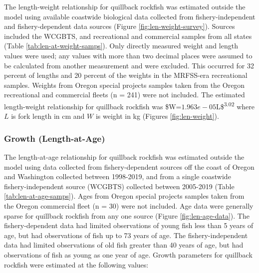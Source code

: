 \documentclass[11pt,
  english,
  letterpaper,
]{article}
\begin{document}
The length-weight relationship for quillback rockfish was estimated outside the model using available coastwide biological data collected from fishery-independent and fishery-dependent data sources (Figure \ref{fig:len-weight-survey}). Sources included the WCGBTS, and recreational and commercial samples from all states (Table \ref{tab:len-at-weight-samps}). Only directly measured weight and length values were used; any values with more than two decimal places were assumed to be calculated from another measurement and were excluded. This occurred for 32 percent of lengths and 20 percent of the weights in the MRFSS-era recreational samples. Weights from Oregon special projects samples taken from the Oregon recreational and commercial fleets (n = 241) were not included. The estimated length-weight relationship for quillback rockfish was \$W={\(1.963e-05\)\leavevmode\tagmcend\tagstructend}L\$\textsuperscript{3.02} where {\(L\)\leavevmode\tagmcend\tagstructend} is fork length in cm and {\(W\)\leavevmode\tagmcend\tagstructend} is weight in kg (Figures \ref{fig:len-weight}).

\leavevmode\tagmcend\tagstructend\par


\hypertarget{growth-length-at-age}{%
\subsubsection{Growth (Length-at-Age)}\label{growth-length-at-age}}

\leavevmode\tagmcend\tagstructend


The length-at-age relationship for quillback rockfish was estimated outside the model using data collected from fishery-dependent sources off the coast of Oregon and Washington collected between 1998-2019, and from a single coastwide fishery-independent source (WCGBTS) collected between 2005-2019 (Table \ref{tab:len-at-age-samps}). Ages from Oregon special projects samples taken from the Oregon commercial fleet (n = 30) were not included. Age data were generally sparse for quillback rockfish from any one source (Figure \ref{fig:len-age-data}). The fishery-dependent data had limited observations of young fish less than 5 years of age, but had observations of fish up to 73 years of age. The fishery-independent data had limited observations of old fish greater than 40 years of age, but had observations of fish as young as one year of age. Growth parameters for quillback rockfish were estimated at the following values:
\end{document}
